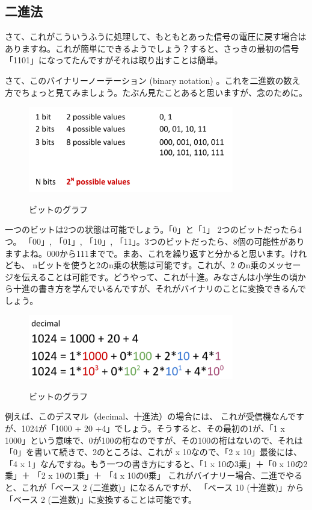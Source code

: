 \subsection{二進法}
さて、これがこういうふうに処理して、もともとあった信号の電圧に戻す場合はありますね。これが簡単にできるようでしょう？すると、さっきの最初の信号「1101」になってたんですがそれは取り出すことは簡単。

さて、このバイナリーノーテーション (binary notation) 。これを二進数の数え方でちょっと見てみましょう。たぶん見たことあると思いますが、念のために。
\begin{figure}[H]
    \centering
    \includegraphics[width=0.8\textwidth]{lesson1/binary_notation.pdf}
    \label{fig: 1}
    \begin{center}
        \caption{ビットのグラフ}
    \end{center}
\end{figure}
一つのビットは2つの状態は可能でしょう。「0」と「1」
2つのビットだったら4つ。  「00」, 「01」, 「10」, 「11」。3つのビットだったら、8個の可能性がありますよね。000から111までで。まあ、これを繰り返すと分かると思います。けれども、
nビットを使うと2のn乗の状態は可能です。これが、2 のn乗のメッセージを伝えることは可能です。どうやって、これが十進。みなさんは小学生の頃から十進の書き方を学んでいるんですが、それがバイナリのことに変換できるんでしょう。
\begin{figure}[H]
    \centering
    \includegraphics[width=0.8\textwidth]{lesson1/decimal_notation.pdf}
    \label{fig: 1}
    \begin{center}
        \caption{ビットのグラフ}
    \end{center}
\end{figure}
例えば、このデスマル（decimal、十進法）の場合には、
これが受信機なんですが、1024が「1000 + 20 +4」でしょう。そうすると、その最初の1が、「1 x 1000」という意味で、0が100の桁なのですが、その100の桁はないので、それは「0」を書いて続きで、2のところは、これが x 10なので、「2 x 10」最後には、「4 x 1」なんですね。もう一つの書き方にすると、「1 x 10の3乗」＋「0 x 10の2乗」＋ 「2 x 10の1乗」＋ 「4 x 10の0乗」
これがバイナリー場合、二進でやると、これが「ベース 2 (二進数)」になるんですが、
「ベース 10 (十進数)」から「ベース 2 (二進数)」に変換することは可能です。


